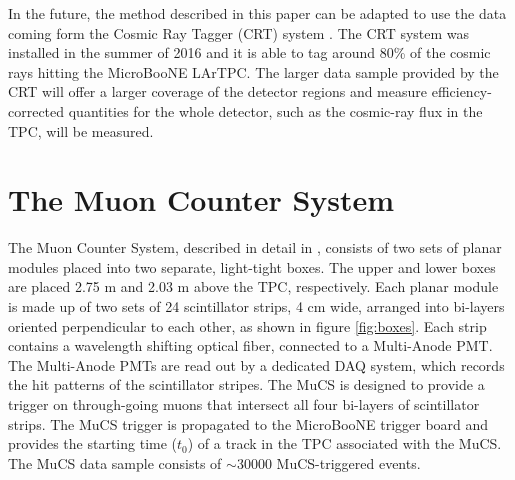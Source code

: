 \documentclass[a4paper,11pt]{article}
\begin{document}

In the future, the method described in this paper can be adapted to use the data coming form the Cosmic Ray Tagger (CRT) system \cite{crt}. The CRT system was installed in the summer of 2016 and it is able to tag around 80\% of the cosmic rays hitting the MicroBooNE LArTPC. The larger data sample provided by the CRT will offer a larger coverage of the detector regions  and measure efficiency-corrected quantities for the whole detector, such as the cosmic-ray flux in the TPC, will be measured.


\section{The Muon Counter System}\label{sec:proc}
The Muon Counter System, described in detail in \cite{mucs}, consists of two sets of planar modules placed into two separate, light-tight boxes. The upper and lower boxes are placed 2.75 m and 2.03 m above the TPC, respectively. Each planar module is made up of two sets of 24 scintillator strips, 4 cm wide, arranged into bi-layers oriented perpendicular to each other, as shown in figure \ref{fig:boxes}. Each strip contains a wavelength shifting optical fiber, connected to a Multi-Anode PMT. The Multi-Anode PMTs are read out by a dedicated DAQ system, which records the hit patterns of the scintillator stripes.
The MuCS is designed to provide a trigger on through-going muons that intersect all four bi-layers of scintillator strips. The MuCS trigger is propagated to the MicroBooNE trigger board and provides the starting time ($t_0$) of a track in the TPC associated with the MuCS. The MuCS data sample consists of $\sim$30000 MuCS-triggered events.
\end{document}
